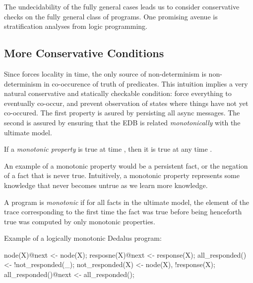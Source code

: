 
The undecidability of the fully general cases leads us to consider conservative checks on the fully general class of programs.  One promising avenue is stratification analyses from logic programming.

\subsection{More Conservative Conditions}

Since \lang forces locality in time, the only source of non-determinism is non-determinism in co-occurence of truth of predicates.  This intuition implies a very natural conservative and statically checkable condition: force everything to eventually co-occur, and prevent observation of states where things have not yet co-occured.  The first property is asured by persisting all async messages.  The second is assured by ensuring that the EDB is related {\em monotonically} with the ultimate model.

\begin{definition}
If a {\em monotonic property} is true at time , then it is true at any time .
\end{definition}

An example of a monotonic property would be a persistent fact, or the negation of a fact that is never true.  Intuitively, a monotonic property represents some knowledge that never becomes untrue as we learn more knowledge.

\begin{definition}
A \lang program is {\em monotonic} if for all facts in the ultimate model, the element of the trace corresponding to the first time the fact was true before being henceforth true was computed by only monotonic properties. 
\end{definition}

\begin{example}
Example of a logically monotonic Dedalus program:\\
\begin{Dedalus}
node(X)@next <- node(X);
resposne(X)@next <- response(X);
all_responded() <- !not_responded(_);
not_responded(X) <- node(X), !response(X);
all_responded()@next <- all_responded();
\end{Dedalus}
\end{example}

